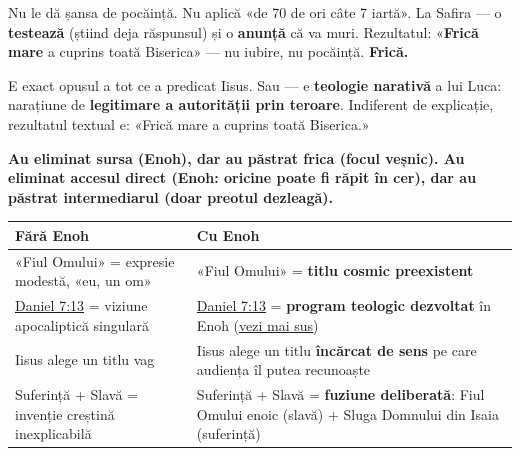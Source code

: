 \documentclass[12pt,a4paper,twoside,openany]{book}
\begin{document}
Nu le dă șansa de pocăință. Nu aplică «de 70 de ori câte 7 iartă». La Safira — o \textbf{testează} (știind deja răspunsul) și o \textbf{anunță} că va muri. Rezultatul: «\textbf{Frică mare} a cuprins toată Biserica» — nu iubire, nu pocăință. \textbf{Frică.}

E exact opusul a tot ce a predicat Iisus. Sau — e \textbf{teologie narativă} a lui Luca: narațiune de \textbf{legitimare a autorității prin teroare}. Indiferent de explicație, rezultatul textual e: «Frică mare a cuprins toată Biserica.»

\textbf{Au eliminat sursa (Enoh), dar au păstrat frica (focul veșnic). Au eliminat accesul direct (Enoh: oricine poate fi răpit în cer), dar au păstrat intermediarul (doar preotul dezleagă).}

\begin{center}
\small
\begin{tabular}{L{5.0cm}L{10.1cm}}
\toprule
{}
\textbf{Fără Enoh} & \textbf{Cu Enoh} \\
\midrule
«Fiul Omului» = expresie modestă, «eu, un om» & «Fiul Omului» = \textbf{titlu cosmic preexistent} \\
\href{https://bibliaortodoxa.ro/carte.php?id=16\&cap=7\#13}{Daniel 7:13} = viziune apocaliptică singulară & \href{https://bibliaortodoxa.ro/carte.php?id=16\&cap=7\#13}{Daniel 7:13} = \textbf{program teologic dezvoltat} în Enoh (\href{\#program-teologic}{vezi mai sus}) \\
Iisus alege un titlu vag & Iisus alege un titlu \textbf{încărcat de sens} pe care audiența îl putea recunoaște \\
Suferință + Slavă = invenție creștină inexplicabilă & Suferință + Slavă = \textbf{fuziune deliberată}: Fiul Omului enoic (slavă) + Sluga Domnului din Isaia (suferință) \\
\bottomrule
\end{tabular}
\end{center}
\normalsize
\end{document}
